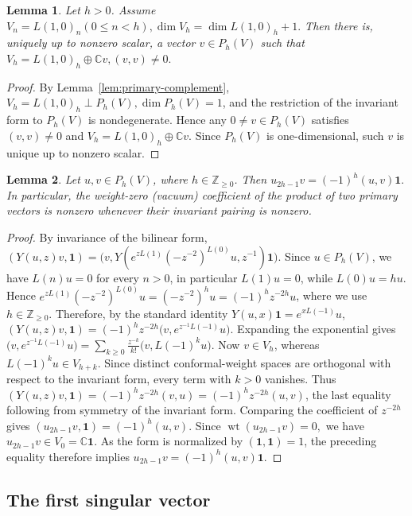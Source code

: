 \documentclass[12pt,leqno]{amsart}
\numberwithin{equation}{section} \newtheorem{thm}{Theorem}[section] \newtheorem{lem}[thm]{Lemma} \newtheorem{ex}[thm]{Example} \newtheorem{prop}[thm]{Proposition} \newtheorem{cor}[thm]{Corollary} \newtheorem{defi}[thm]{Definition} \newtheorem{rmk}[thm]{Remark} \newtheorem{notation}[thm]{Notation}
\newcommand{\one}{\mathbf{1}}
\newcommand{\wt}{\operatorname{wt}}
\def\Z{\mathbb{Z}} \def\N{\mathbb{N}} \def\A{\mathbb{A}} \def\C{\mathbb{C}} \def\R{\mathbb{R}} \def\Q{\mathbb{Q}} \def\F{\mathbb{F}}
\begin{document}
\begin{lem}\label{lem:first-primary}
Let $h>0$. Assume \(V_n=L(1,0)_n(0\le n<h),\dim V_h=\dim L(1,0)_h+1.\) Then there is, uniquely up to nonzero scalar, a vector $v\in P_h(V)$ such that \(V_h=L(1,0)_h\oplus\C v,(v,v)\ne0.\)
\end{lem}

\begin{proof}
By Lemma~\ref{lem:primary-complement}, \(V_h=L(1,0)_h\mathbin{\perp}P_h(V),\dim P_h(V)=1\), and the restriction of the invariant form to \(P_h(V)\) is nondegenerate. Hence any \(0\ne v\in P_h(V)\) satisfies \((v,v)\ne0\) and $ V_h=L(1,0)_h\oplus\C v. $ Since \(P_h(V)\) is one-dimensional, such \(v\) is unique up to nonzero scalar.
\end{proof}

\begin{lem}\label{lem:vacuum-channel}
Let $u,v\in P_h(V)$, where $h\in\Z_{\ge0}$. Then \(u_{2h-1}v=(-1)^h(u,v)\one.\) In particular, the weight-zero (vacuum) coefficient of the product of two primary vectors is nonzero whenever their invariant pairing is nonzero.
\end{lem}

\begin{proof}
By invariance of the bilinear form, \((Y(u,z)v,\one)=\bigl(v,Y(e^{zL(1)}(-z^{-2})^{L(0)}u,z^{-1})\one\bigr)\). Since \(u\in P_h(V)\), we have \(L(n)u=0\) for every \(n>0\), in particular \(L(1)u=0\), while \(L(0)u=hu\). Hence \(e^{zL(1)}(-z^{-2})^{L(0)}u=(-z^{-2})^h u=(-1)^hz^{-2h}u\), where we use \(h\in\Z_{\ge0}\). Therefore, by the standard identity \(Y(u,x)\one=e^{xL(-1)}u\), \((Y(u,z)v,\one)=(-1)^hz^{-2h}\bigl(v,e^{z^{-1}L(-1)}u\bigr)\). Expanding the exponential gives \(\bigl(v,e^{z^{-1}L(-1)}u\bigr)=\sum_{k\ge0}\frac{z^{-k}}{k!}\bigl(v,L(-1)^ku\bigr)\). Now \(v\in V_h\), whereas \(L(-1)^ku\in V_{h+k}\). Since distinct conformal-weight spaces are orthogonal with respect to the invariant form, every term with \(k>0\) vanishes. Thus \((Y(u,z)v,\one)=(-1)^hz^{-2h}(v,u)=(-1)^hz^{-2h}(u,v)\), the last equality following from symmetry of the invariant form. Comparing the coefficient of \(z^{-2h}\) gives $ (u_{2h-1}v,\one)=(-1)^h(u,v). $ Since $ \wt(u_{2h-1}v) = 0, $ we have \(u_{2h-1}v\in V_0=\C\one\). As the form is normalized by \((\one,\one)=1\), the preceding equality therefore implies $ u_{2h-1}v=(-1)^h(u,v)\one. $
\end{proof}

\subsection{The first singular vector}
\end{document}
